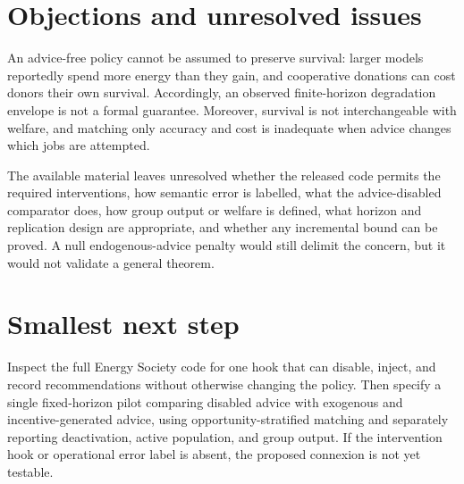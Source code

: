 \documentclass{article}
\begin{document}
\section{Objections and unresolved issues}

An advice-free policy cannot be assumed to preserve survival: larger models reportedly spend more energy than they gain, and cooperative donations can cost donors their own survival.  Accordingly, an observed finite-horizon degradation envelope is not a formal guarantee.  Moreover, survival is not interchangeable with welfare, and matching only accuracy and cost is inadequate when advice changes which jobs are attempted. 

The available material leaves unresolved whether the released code permits the required interventions, how semantic error is labelled, what the advice-disabled comparator does, how group output or welfare is defined, what horizon and replication design are appropriate, and whether any incremental bound can be proved.  A null endogenous-advice penalty would still delimit the concern, but it would not validate a general theorem. 

\section{Smallest next step}

Inspect the full Energy Society code for one hook that can disable, inject, and record recommendations without otherwise changing the policy.  Then specify a single fixed-horizon pilot comparing disabled advice with exogenous and incentive-generated advice, using opportunity-stratified matching and separately reporting deactivation, active population, and group output.  If the intervention hook or operational error label is absent, the proposed connexion is not yet testable. 
\end{document}
